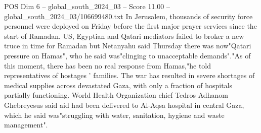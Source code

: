 \begin{textsample}{POS Dim 6 – global\_south\_2024\_03 – Score 11.00 – global\_south\_2024\_03/106699480.txt}
In Jerusalem, thousands of security force personnel were deployed on Friday before the first major prayer services since the start of Ramadan.
US, Egyptian and Qatari mediators failed to broker a new truce in time for Ramadan but Netanyahu said Thursday there was now"Qatari pressure on Hamas", who he said was"clinging to unacceptable demands"."As of this moment, there has been no real response from Hamas,"he told representatives of hostages ' families.
The war has resulted in severe shortages of medical supplies across devastated Gaza, with only a fraction of hospitals partially functioning.
World Health Organization chief Tedros Adhanom Ghebreyesus said aid had been delivered to Al-Aqsa hospital in central Gaza, which he said was"struggling with water, sanitation, hygiene and waste management".

\end{textsample}
